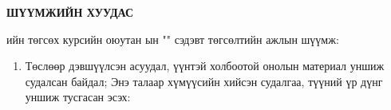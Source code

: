 \begin{titlepage}
\begin{center}

{\scshape\Large \univname\par} %
{\scshape\large \facname\par}\vspace{1cm} %

\textbf{{\Large ШҮҮМЖИЙН ХУУДАС}}\\[1cm]

\end{center}

\normalsize

\deptname ийн төгсөх курсийн оюутан \shortname ын "\ttitle" сэдэвт төгсөлтийн ажлын шүүмж:

\begin{enumerate}
\item Төслөөр дэвшүүлсэн асуудал, үүнтэй холбоотой онолын материал уншиж судалсан байдал; Энэ талаар хүмүүсийн хийсэн судалгаа, түүний үр дүнг уншиж тусгасан эсэх:
\begin{center}
\dotfill \\[0.1cm]
\dotfill \\[0.1cm]
\dotfill \\[0.1cm]
\dotfill \\[0.1cm]
\dotfill \\[0.1cm]
\dotfill \\[0.1cm]


\end{center}
\end{enumerate}
\end{titlepage}
